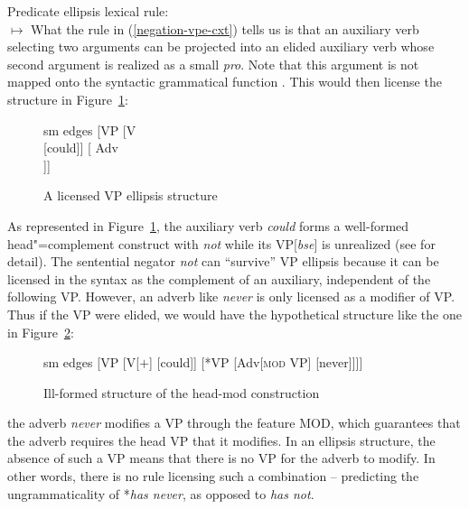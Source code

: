 \documentclass[output=paper
                ,modfonts
                ,nonflat
	        ,collection
	        ,collectionchapter
	        ,collectiontoclongg
 	        ,biblatex
                ,babelshorthands
                ,newtxmath
                ,draftmode
                ,colorlinks, citecolor=brown
]{./langsci/langscibook}
\begin{document}
{\begin{exe}
\begin{xlist}
\begin{exe}
\begin{xlist}
\ea
\label{negation-vpe-cxt}
Predicate ellipsis lexical rule:\\
  $\mapsto$
\z
%
%
What the rule in (\ref{negation-vpe-cxt}) tells us is that an auxiliary verb selecting two arguments
can be projected into an elided auxiliary verb whose second argument
is realized as a small {\it pro}. Note that this argument is not mapped
onto the syntactic grammatical function \COMPS. This would then license
the structure in Figure~\ref{negation-could-not}:
%
%
%
%
\begin{figure}
	\begin{forest}
		sm edges
		[VP
			[V\\
					[could]]
			[ Adv\\
					[not]]]
	\end{forest}
\caption{A licensed VP ellipsis structure}\label{negation-could-not}
\end{figure}

As represented in Figure~\ref{negation-could-not}, the auxiliary verb \textit{could} forms a well-formed head"=complement construct with \textit{not} while its
VP[\textit{bse}] is unrealized (see \citealt{Kim:00, KS:08} for
detail). The sentential negator \textit{not} can ``survive'' VP ellipsis because it can be
licensed in the syntax as the complement of an auxiliary, independent
of the following VP.  However, an adverb like \textit{never} is only
licensed as a modifier of VP. Thus if the VP were elided, we would have the hypothetical
structure like the one in Figure~\ref{negation-fig-could-never}:
\begin{figure}
	\begin{forest}
		sm edges
		[VP
			[V{[\aux $+$]}
				[could]]
			[*VP
				[Adv{[\textsc{mod} VP]}
					[never]]]]
	\end{forest}
\caption{Ill-formed structure of the head-mod construction}\label{negation-fig-could-never}
\end{figure}
the adverb \textit{never} modifies a VP through the feature \textsc{MOD},
which guarantees that the adverb requires the head VP that it
modifies. In an ellipsis structure, the absence of such a VP means
that there is no VP for the adverb to modify.  In other words, there
is no rule licensing such a combination -- predicting the
ungrammaticality of *\textit{has never},  as opposed to \textit{has not}.



\end{xlist}
\end{exe}
\end{xlist}
\end{exe}}
\end{document}
